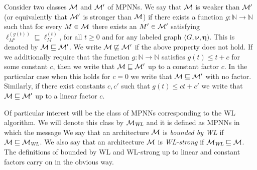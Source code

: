 \begin{definition}\label{def:comparing}\normalfont
Consider two classes $\mathcal{M}$ and $\mathcal{M}'$ of MPNNs. We say that $\mathcal{M}$ is weaker than $\mathcal{M}'$ (or equivalently that $\mathcal{M}'$ is stronger than $\mathcal{M}$) if there exists a function $g:\mathbb{N}\to \mathbb{N}$ such that for every $M \in \mathcal{M}$ there exists an $M'\in \mathcal{M}'$ satisfying $\pmb{\ell}_{M'}^{(g(t))}\sqsubseteq \pmb{\ell}_{M}^{(t)}$, for all $t\geq 0$ and for any labeled graph $\langle G,\pmb{\nu},\pmb{\eta})$. This is denoted by $\mathcal{M} \sqsubseteq \mathcal{M}'$.
We write $\mathcal{M} \not \sqsubseteq \mathcal{M}'$ if the above property does not hold. 
If we additionally require that the function $g:\mathbb{N}\to\mathbb{N}$ satisfies 
$g(t)\le t +c$ for some constant $c$, then we write that $\mathcal{M} \sqsubseteq \mathcal{M}'$ up to a constant factor $c$. In the particular case when this holds for $c = 0$ we write that $\mathcal{M} \sqsubseteq \mathcal{M}'$ with no factor. Similarly, if there exist constants $c, c'$ such that $g(t) \le ct + c'$ we write that $\mathcal{M} \sqsubseteq \mathcal{M}'$ up to a linear factor $c$.
\end{definition}

Of particular interest will be the class of MPNNs corresponding to the WL algorithm. 
We will denote this class by $\mathcal{M}_{\textsl{WL}}$ and it is defined as MPNNs in which the message 
We say that an architecture $\mathcal{M}$ is \emph{bounded by WL} if $\mathcal{M}\sqsubseteq \mathcal{M}_{\textsl{WL}}$. We also say that an architecture $\mathcal{M}$ is \emph{WL-strong} if $\mathcal{M}_{\textsl{WL}} \sqsubseteq \mathcal{M}$. The definitions of bounded by WL and WL-strong up to linear and constant factors carry on in the obvious way.


